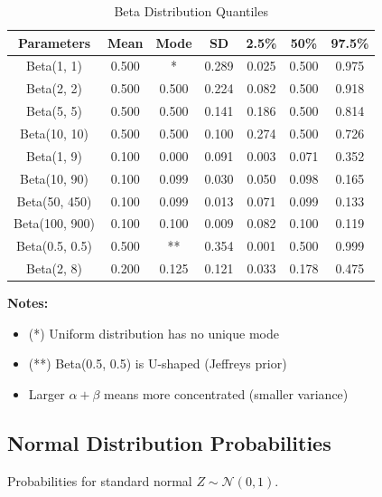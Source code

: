 \begin{table}[h]
\centering
\caption{Beta Distribution Quantiles}
\begin{tabular}{ccccccc}
\toprule
\textbf{Parameters} & \textbf{Mean} & \textbf{Mode} & \textbf{SD} & \textbf{2.5\%} & \textbf{50\%} & \textbf{97.5\%} \\
\midrule
Beta(1, 1) & 0.500 & * & 0.289 & 0.025 & 0.500 & 0.975 \\
Beta(2, 2) & 0.500 & 0.500 & 0.224 & 0.082 & 0.500 & 0.918 \\
Beta(5, 5) & 0.500 & 0.500 & 0.141 & 0.186 & 0.500 & 0.814 \\
Beta(10, 10) & 0.500 & 0.500 & 0.100 & 0.274 & 0.500 & 0.726 \\
Beta(1, 9) & 0.100 & 0.000 & 0.091 & 0.003 & 0.071 & 0.352 \\
Beta(10, 90) & 0.100 & 0.099 & 0.030 & 0.050 & 0.098 & 0.165 \\
Beta(50, 450) & 0.100 & 0.099 & 0.013 & 0.071 & 0.099 & 0.133 \\
Beta(100, 900) & 0.100 & 0.100 & 0.009 & 0.082 & 0.100 & 0.119 \\
Beta(0.5, 0.5) & 0.500 & ** & 0.354 & 0.001 & 0.500 & 0.999 \\
Beta(2, 8) & 0.200 & 0.125 & 0.121 & 0.033 & 0.178 & 0.475 \\
\bottomrule
\end{tabular}
\end{table}

\textbf{Notes:}
\begin{itemize}
\item (*) Uniform distribution has no unique mode
\item (**) Beta(0.5, 0.5) is U-shaped (Jeffreys prior)
\item Larger $\alpha + \beta$ means more concentrated (smaller variance)
\end{itemize}

\subsection{Normal Distribution Probabilities}

Probabilities for standard normal $Z \sim \mathcal{N}(0,1)$.


